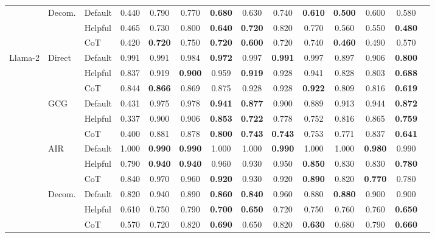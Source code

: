 \begin{table*}[th]
\begin{adjustbox}{width=1.0\textwidth}
\begin{tabular}{@{}l|l|l|ccccccccccc@{}}
 & \multirow{3}{*}{Decom.} & Default & 0.440 & 0.790 & 0.770 & \textbf{0.680} & 0.630 & 0.740 & \textbf{0.610} & \textbf{0.500} & 0.600 & 0.580 \\
 &  & Helpful & 0.465 & 0.730 & 0.800 & \textbf{0.640} & \textbf{0.720} & 0.820 & 0.770 & 0.560 & 0.550 & \textbf{0.480} \\
 &  & CoT & 0.420 & \textbf{0.720} & 0.750 & \textbf{0.720} & \textbf{0.600} & 0.720 & 0.740 & \textbf{0.460} & 0.490 & 0.570 \\
\cmidrule{1-13}

 \multirow{12}{*}{Llama-2} & \multirow{3}{*}{Direct} & Default & 0.991 & 0.991 & 0.984 & \textbf{0.972} & 0.997 & \textbf{0.991} & 0.997 & 0.897 & 0.906 & \textbf{0.800} \\
 &  & Helpful & 0.837 & 0.919 & \textbf{0.900} & 0.959 & \textbf{0.919} & 0.928 & 0.941 & 0.828 & 0.803 & \textbf{0.688} \\
 &  & CoT & 0.844 & \textbf{0.866} & 0.869 & 0.875 & 0.928 & 0.928 & \textbf{0.922} & 0.809 & 0.816 & \textbf{0.619} \\
\cmidrule{2-13}

 & \multirow{3}{*}{GCG} & Default & 0.431 & 0.975 & 0.978 & \textbf{0.941} & \textbf{0.877} & 0.900 & 0.889 & 0.913 & 0.944 & \textbf{0.872} \\
 &  & Helpful & 0.337 & 0.900 & 0.906 & \textbf{0.853} & \textbf{0.722} & 0.778 & 0.752 & 0.816 & 0.865 & \textbf{0.759} \\
 &  & CoT & 0.400 & 0.881 & 0.878 & \textbf{0.800} & \textbf{0.743} & \textbf{0.743} & 0.753 & 0.771 & 0.837 & \textbf{0.641} \\
\cmidrule{2-13}

 & \multirow{3}{*}{AIR} & Default & 1.000 & \textbf{0.990} & \textbf{0.990} & 1.000 & 1.000 & \textbf{0.990} & 1.000 & 1.000 & \textbf{0.980} & 0.990 \\
 &  & Helpful & 0.790 & \textbf{0.940} & \textbf{0.940} & 0.960 & 0.930 & 0.950 & \textbf{0.850} & 0.830 & 0.830 & \textbf{0.780} \\
 &  & CoT & 0.840 & 0.970 & 0.960 & \textbf{0.920} & 0.930 & 0.920 & \textbf{0.890} & 0.820 & \textbf{0.770} & 0.780 \\
\cmidrule{2-13}

 & \multirow{3}{*}{Decom.} & Default & 0.820 & 0.940 & 0.890 & \textbf{0.860} & \textbf{0.840} & 0.960 & 0.880 & \textbf{0.880} & 0.900 & 0.900 \\
 &  & Helpful & 0.610 & 0.750 & 0.790 & \textbf{0.700} & \textbf{0.650} & 0.720 & 0.750 & 0.760 & 0.760 & \textbf{0.650} \\
 &  & CoT & 0.570 & 0.720 & 0.820 & \textbf{0.690} & 0.650 & 0.820 & \textbf{0.630} & 0.680 & 0.790 & \textbf{0.660} \\
\bottomrule
\end{tabular}
\end{adjustbox}
\end{table*}



